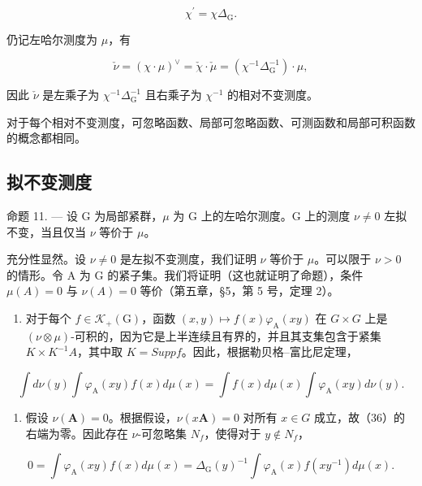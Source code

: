 \[
\chi^ {\prime} = \chi \Delta_ {\mathrm{G}}.\tag{35}
\]

仍记左哈尔测度为 \(\mu\)，有

\[
\check {\nu} = (\chi \cdot \mu) ^ {\vee} = \check {\chi} \cdot \check {\mu} = (\chi^ {- 1} \Delta_ {\mathrm{G}} ^ {- 1}) \cdot \mu ,
\]

因此 \(\check{\nu}\) 是左乘子为 \(\chi^{-1}\Delta_{\mathrm{G}}^{-1}\) 且右乘子为 \(\chi^{-1}\) 的相对不变测度。

对于每个相对不变测度，可忽略函数、局部可忽略函数、可测函数和局部可积函数的概念都相同。

\subsection{拟不变测度}

命题 11. --- 设 G 为局部紧群，\(\mu\) 为 G 上的左哈尔测度。G 上的测度 \(\nu \neq 0\) 左拟不变，当且仅当 \(\nu\) 等价于 \(\mu\)。

充分性显然。设 \(\nu \neq 0\) 是左拟不变测度，我们证明 \(\nu\) 等价于 \(\mu\)。可以限于 \(\nu > 0\) 的情形。令 A 为 G 的紧子集。我们将证明（这也就证明了命题），条件 \(\mu(A) = 0\) 与 \(\nu(A) = 0\) 等价（第五章，§5，第 5 号，定理 2）。

\begin{enumerate}
\def\labelenumi{\alph{enumi})}
\tightlist
\item
  对于每个 \(f \in \mathcal{K}_{+}(\mathrm{G})\)，函数 \((x, y) \mapsto f(x)\varphi_{\mathrm{A}}(xy)\) 在 \(G \times G\) 上是 \((\nu \otimes \mu)\)-可积的，因为它是上半连续且有界的，并且其支集包含于紧集 \(K \times K^{-1}A\)，其中取 \(K = Supp f\)。因此，根据勒贝格--富比尼定理，
\end{enumerate}

\[
\int d \nu (y) \int \varphi_ {\mathrm{A}} (x y) f (x) d \mu (x) = \int f (x) d \mu (x) \int \varphi_ {\mathrm{A}} (x y) d \nu (y).\tag{36}
\]

\begin{enumerate}
\def\labelenumi{\alph{enumi})}
\setcounter{enumi}{1}
\tightlist
\item
  假设 \(\nu(\mathbf{A}) = 0\)。根据假设，\(\nu(x\mathbf{A}) = 0\) 对所有 \(x \in G\) 成立，故（36）的右端为零。因此存在 \(\nu\)-可忽略集 \(N_{f}\)，使得对于 \(y \notin N_{f}\)，
\end{enumerate}

\[
0 = \int \varphi_ {\mathrm{A}} (x y) f (x) d \mu (x) = \Delta_ {\mathrm{G}} (y) ^ {- 1} \int \varphi_ {\mathrm{A}} (x) f (x y ^ {- 1}) d \mu (x).\tag{37}
\]

